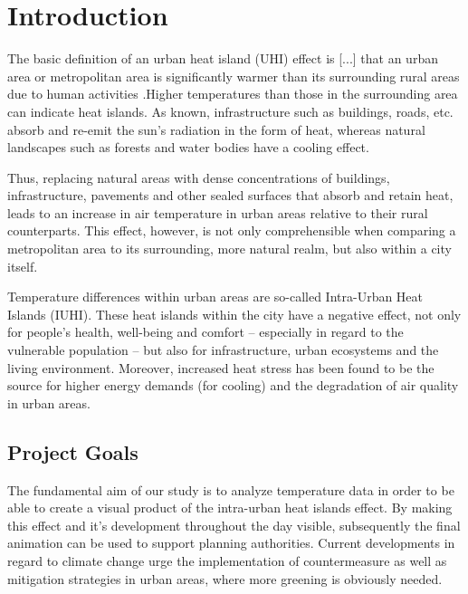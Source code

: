 
\section{Introduction}

The basic definition of an urban heat island (UHI) effect is \ldq{}[...] that an urban area or metropolitan area is significantly warmer than its surrounding rural areas due to human activities\rdq{} \cite{takebayashi_chapter_2020}.Higher temperatures than those in the surrounding area can indicate heat islands. As known, infrastructure such as buildings, roads, etc. absorb and re-emit the sun’s radiation in the form of heat, whereas natural landscapes such as forests and water bodies have a cooling effect. \cite{us_epa_learn_2014}

Thus, replacing natural areas with dense concentrations of buildings, infrastructure, pavements and other sealed surfaces that absorb and retain heat, leads to an increase in air temperature in urban areas relative to their rural counterparts. This effect, however, is not only comprehensible when comparing a metropolitan area to its surrounding, more natural realm, but also within a city itself. 

Temperature differences within urban areas are so-called \ldq{}Intra-Urban Heat Islands (IUHI)\rdq{}. %
These heat islands within the city have a negative effect, not only for people’s health, well-being and comfort – especially in regard to the vulnerable population – but also for infrastructure, urban ecosystems and the living environment. Moreover, increased heat stress has been found to be the source for higher energy demands (for cooling) and the degradation of air quality in urban areas. %

\subsection{Project Goals}

The fundamental aim of our study is to analyze temperature data in order to be able to create a visual product of the intra-urban heat islands effect. By making this effect and it's development throughout the day visible, subsequently the final animation can be used to support planning authorities. Current developments in regard to climate change urge the implementation of countermeasure as well as mitigation strategies in urban areas, where more greening is obviously needed. \cite{ketterer_comparison_2015}

